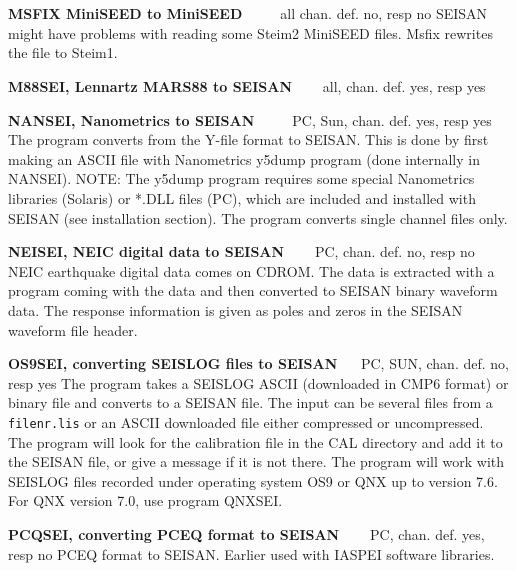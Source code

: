 \textbf{MSFIX MiniSEED to MiniSEED} \verb|    | all chan. def. no, resp no \newline
SEISAN might have problems with reading some Steim2 MiniSEED files. Msfix rewrites the file to Steim1. 

\textbf{M88SEI, Lennartz MARS88 to SEISAN} \verb|   |  all, chan. def. yes, resp yes\newline
{}

\textbf{NANSEI, Nanometrics to SEISAN} \verb|    | PC, Sun, chan. def. yes, resp yes\newline
{}
The program converts from the Y-file format to SEISAN. This is done by first making an ASCII file with Nanometrics y5dump program (done internally in NANSEI). NOTE: The y5dump program requires some special Nanometrics libraries (Solaris) or *.DLL files (PC), which are included and installed with SEISAN (see installation section). The program converts single channel files only. 

\textbf{NEISEI, NEIC digital data to SEISAN} \verb|   | PC, chan. def. no, resp no \newline
{}
NEIC earthquake digital data comes on CDROM. The data is extracted with a program coming with the data and then converted to SEISAN binary waveform data. The response information is given as poles and zeros in the SEISAN waveform file header. 

\textbf{OS9SEI, converting SEISLOG files to SEISAN} \verb|  | PC, SUN, chan. def. no, resp yes\newline
{}The program takes a SEISLOG ASCII (downloaded in CMP6 format) or binary file and converts to a SEISAN file. The input can be several files from a \texttt{filenr.lis} or an ASCII downloaded file either compressed or uncompressed. The program will look for the calibration file in the CAL directory and add it to the SEISAN file, or give a message if it is not there. The program will work with SEISLOG files recorded under operating system OS9 or QNX up to version 7.6. For QNX version 7.0, use program QNXSEI. 

\textbf{PCQSEI, converting PCEQ format to SEISAN} \verb|   | PC, chan. def. yes, resp no \newline
{}PCEQ format to SEISAN. Earlier used with IASPEI software libraries. 

